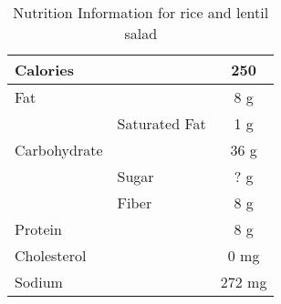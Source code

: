 \begin{table}%
    \centering
    \begin{tabular}{|ll|c|}
        \hline
        Calories & & 250\\
        \hline
        Fat & & 8 g\\
        \hline
         & Saturated Fat & 1 g\\
        \hline
        Carbohydrate & & 36 g\\
        \hline
         & Sugar & ? g\\
         & Fiber & 8 g\\
        \hline
        Protein & & 8 g\\
        \hline
        Cholesterol & & 0 mg\\
        \hline
        Sodium & & 272 mg\\
        \hline
    \end{tabular}
    \caption{Nutrition Information for rice and lentil salad}
\end{table}

